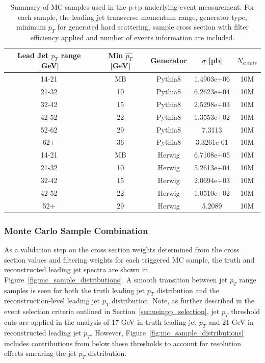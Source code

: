 \begin{table}[ht]    
\centering
\begin{tabular}{|c|cccc|}
\hline
Lead Jet $p_T$ range [GeV] & Min $\hat{p_{T}}$ [GeV] & Generator & $\sigma$ [pb] & $N_{events}$ \\ \hline
14-21 & MB & Pythia8   & 1.4903e+06 & 10M   \\ \hline
21-32 & 10 & Pythia8   & 6.2623e+04 & 10M   \\ \hline
32-42 & 15 & Pythia8   & 2.5298e+03 & 10M   \\ \hline
42-52 & 22 & Pythia8   & 1.3553e+02 & 10M   \\ \hline
52-62 & 29 & Pythia8   & 7.3113     & 10M   \\ \hline
62+   & 36 & Pythia8   & 3.3261e-01 & 10M   \\ \hline
14-21 & MB & Herwig    & 6.7108e+05 & 10M   \\ \hline
21-32 & 10 & Herwig    & 5.2613e+04 & 10M   \\ \hline
32-42 & 15 & Herwig    & 2.0694e+03 & 10M   \\ \hline
42-52 & 22 & Herwig    & 1.0510e+02 & 10M   \\ \hline
52+   & 29 & Herwig    & 5.2089     & 10M   \\ \hline
\end{tabular}
\caption{Summary of MC samples used in the p+p underlying event measurement. For each sample, the leading jet transverse momentum range, generator type, minimum $p_{T}$ for generated hard scattering, sample cross section with filter efficiency applied and number of events information are included.}
\label{table:MCdataset} 
\end{table}

\subsubsection{Monte Carlo Sample Combination}
As a validation step on the cross section weights determined from the \pythia cross section values and filtering weights for each triggered MC sample, the truth and reconstructed leading jet spectra are shown in Figure~\ref{fig:mc_sample_distributions}. 
A smooth transition between jet $p_{T}$ range samples is seen for both the truth leading jet $p_{T}$ distribution and the reconstruction-level leading jet $p_{T}$ distribution. 
Note, as further described in the event selection criteria outlined in Section~\ref{sec:ueinpp_selection}, jet $p_{T}$ threshold cuts are applied in the analysis of 17 GeV in truth leading jet $p_{T}$ and 21 GeV in reconstructed leading jet $p_{T}$. However, Figure~\ref{fig:mc_sample_distributions} includes contributions from below these thresholds to account for resolution effects smearing the jet $p_{T}$ distribution. 

